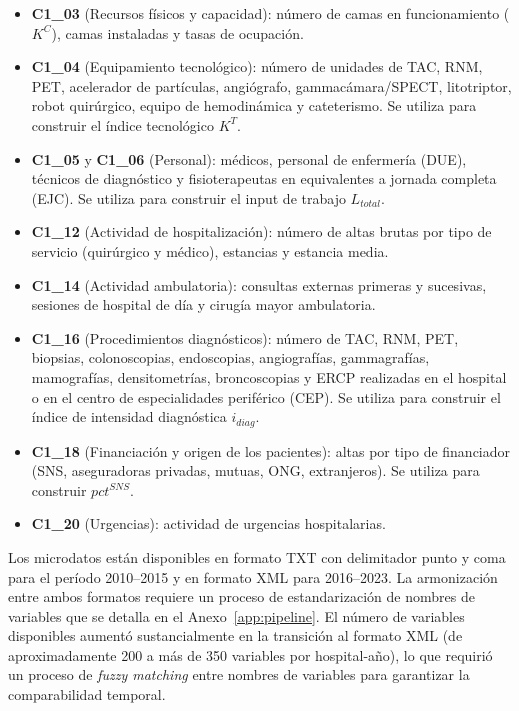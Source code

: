 \begin{itemize}
  \item \textbf{C1\_03} (Recursos físicos y capacidad): número de camas en funcionamiento ($K^C$), camas instaladas y tasas de ocupación.
  \item \textbf{C1\_04} (Equipamiento tecnológico): número de unidades de TAC, RNM, PET, acelerador de partículas, angiógrafo, gammacámara/SPECT, litotriptor, robot quirúrgico, equipo de hemodinámica y cateterismo. Se utiliza para construir el índice tecnológico $K^T$.
  \item \textbf{C1\_05} y \textbf{C1\_06} (Personal): médicos, personal de enfermería (DUE), técnicos de diagnóstico y fisioterapeutas en equivalentes a jornada completa (EJC). Se utiliza para construir el input de trabajo $L_{total}$.
  \item \textbf{C1\_12} (Actividad de hospitalización): número de altas brutas por tipo de servicio (quirúrgico y médico), estancias y estancia media.
  \item \textbf{C1\_14} (Actividad ambulatoria): consultas externas primeras y sucesivas, sesiones de hospital de día y cirugía mayor ambulatoria.
  \item \textbf{C1\_16} (Procedimientos diagnósticos): número de TAC, RNM, PET, biopsias, colonoscopias, endoscopias, angiografías, gammagrafías, mamografías, densitometrías, broncoscopias y ERCP realizadas en el hospital o en el centro de especialidades periférico (CEP). Se utiliza para construir el índice de intensidad diagnóstica $i_{diag}$.
  \item \textbf{C1\_18} (Financiación y origen de los pacientes): altas por tipo de financiador (SNS, aseguradoras privadas, mutuas, ONG, extranjeros). Se utiliza para construir $pct^{SNS}$.
  \item \textbf{C1\_20} (Urgencias): actividad de urgencias hospitalarias.
\end{itemize}

Los microdatos están disponibles en formato TXT con delimitador punto y coma para el período 2010--2015 y en formato XML para 2016--2023. La armonización entre ambos formatos requiere un proceso de estandarización de nombres de variables que se detalla en el Anexo~\ref{app:pipeline}. El número de variables disponibles aumentó sustancialmente en la transición al formato XML (de aproximadamente 200 a más de 350 variables por hospital-año), lo que requirió un proceso de \textit{fuzzy matching} entre nombres de variables para garantizar la comparabilidad temporal.

